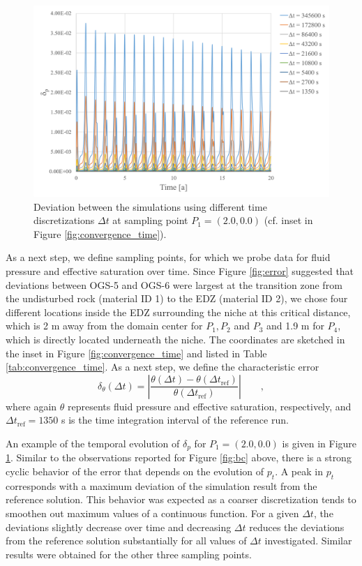 \begin{figure}[t]
\includegraphics[width=\textwidth]{./figures/MEX10_convergence_error.png}
\caption{Deviation between the simulations using different time discretizations $\Delta t$ at sampling point $P_1 = (2.0,0.0)$ (cf. inset in Figure \ref{fig:convergence_time}). }
\label{fig:convergence_error}
\end{figure}

As a next step, we define sampling points, for which we probe data for fluid pressure and effective saturation over time.  Since Figure \ref{fig:error} suggested that deviations between OGS-5 and OGS-6 were largest at the transition zone from the undisturbed rock (material ID 1) to the EDZ (material ID 2), we chose four different locations inside the EDZ surrounding the niche at this critical distance, which is 2 m away from the domain center for $P_1, P_2$ and $P_3$ and 1.9 m for $P_4$, which is directly located underneath the niche. The  coordinates are sketched in the inset in Figure \ref{fig:convergence_time} and listed in Table \ref{tab:convergence_time}. As a next step, we define the characteristic error
%
\begin{equation}
\delta_\theta(\Delta t) = \left \lvert \frac{\theta(\Delta t) - \theta(\Delta t_\text{ref}) }{\theta(\Delta t_\text{ref})} \right \rvert \qquad ,
\end{equation}
%
where again $\theta$ represents fluid pressure and effective saturation, respectively, and $\Delta t_\text{ref}= 1350$ s is the time integration interval of the reference run. 

An example of the temporal evolution of $\delta_p$ for $P_1 = (2.0,0.0)$ is given in Figure \ref{fig:convergence_error}. Similar to the observations reported for Figure \ref{fig:bc} above, there is a strong cyclic behavior of the error that depends on the evolution of $p_t$. A peak in $p_t$ corresponds with a maximum deviation of the simulation result from the reference solution. This behavior was expected as a coarser discretization tends to smoothen out maximum values of a continuous function.  For a given $\Delta t$, the deviations slightly decrease over time and decreasing $\Delta t$ reduces the deviations from the reference solution substantially for all values of $\Delta t$ investigated. Similar results were obtained for the other three sampling points.

